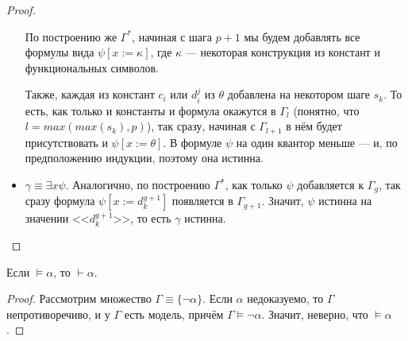 \begin{proof}
\begin{itemize}
По построению же $\Gamma^*$, начиная с шага $p+1$
мы будем добавлять все формулы вида $\psi [x := \kappa]$, где $\kappa$ ---
некоторая конструкция из констант и функциональных символов.

Также, каждая из констант $c_i$ или $d_i^j$ из $\theta$ добавлена на некотором 
шаге $s_k$. То есть, как только и константы и формула окажутся в $\Gamma_l$
(понятно, что $l = max(max(s_k),p)$), так сразу, начиная с $\Gamma_{l+1}$ 
в нём будет присутствовать и $\psi [x := \theta]$. В формуле $\psi$ 
на один квантор меньше --- и, по предположению индукции, поэтому она истинна.

\item $\gamma \equiv \exists x \psi$.
Аналогично, по построению $\Gamma^*$, как только $\psi$ добавляется к $\Gamma_g$,
так сразу формула $\psi[x := d_k^{g+1}]$ появляется в $\Gamma_{g+1}$.
Значит, $\psi$ истинна на значении $\texttt{<<}d_k^{g+1}\texttt{>>}$,
то есть $\gamma$ истинна.
\end{itemize}
\end{proof}

\begin{theorem}
Если $\models \alpha$, то $\vdash \alpha$.
\end{theorem}
\begin{proof}
Рассмотрим множество $\Gamma \equiv \{\neg\alpha\}$. Если $\alpha$ недоказуемо, то 
$\Gamma$ непротиворечиво, и у $\Gamma$ есть модель, причём $\Gamma \models \neg\alpha$.
Значит, неверно, что $\models \alpha$.
\end{proof}
